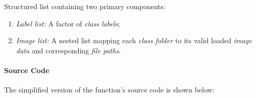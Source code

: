 \documentclass[
]{report}
\providecommand{\tightlist}{%
  \setlength{\itemsep}{0pt}\setlength{\parskip}{0pt}}
\begin{document}
\hfill\break

Structured list containing two primary components:

\begin{enumerate}
\def\labelenumi{\arabic{enumi}.}
\tightlist
\item
  \emph{Label list:} A factor of \emph{class labels};
\item
  \emph{Image list:} A nested list mapping each \emph{class folder} to its valid loaded \emph{image data} and corresponding \emph{file paths}.
\end{enumerate}

\newpage

\protect{}\label{func.load_image.list.code}
\paragraph{Source Code}\label{source-code-1}

\hfill\break

The simplified version of the function's source code is shown below:
\end{document}
